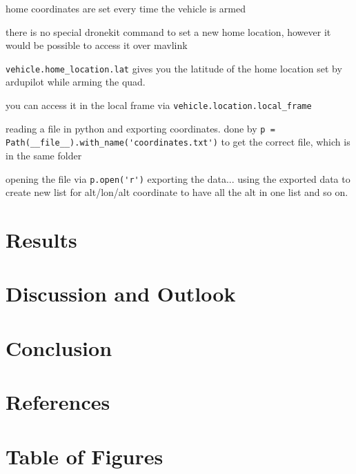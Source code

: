 \documentclass{article}
\begin{document}
	home coordinates are set every time the vehicle is armed
	
	there is no special dronekit command to set a new home location, however it would be possible to access it over mavlink
	
	\lstinline|vehicle.home_location.lat| gives you the latitude of the home location set by ardupilot while arming the quad.
	
	you can access it in the local frame via \lstinline|vehicle.location.local_frame|
	
	
	reading a file in python and exporting coordinates.
	done by \lstinline|p = Path(__file__).with_name('coordinates.txt')| to get the correct file, which is in the same folder
	
	opening the file via \lstinline|p.open('r')|
	exporting the data...
	using the exported data to create new list for alt/lon/alt coordinate to have all the alt in one list and so on.
	
	
	
	
	\section{Results}
	\section{Discussion and Outlook}
	\section{Conclusion}
	
	\section{References}
	\printbibliography[
	heading=bibintoc,
	title={Bibliography}
	]	
	\section{Table of Figures}
\end{document}

